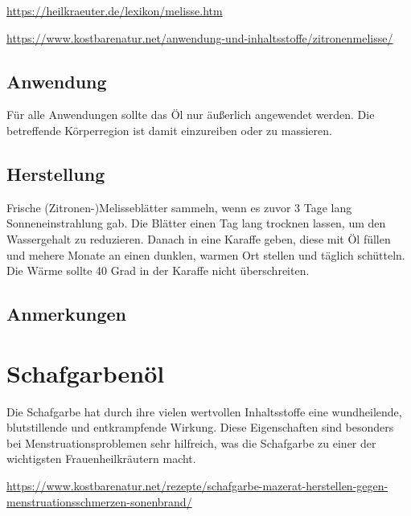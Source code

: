 \cite{heilkraeuterlexikon} 

\url{https://heilkraeuter.de/lexikon/melisse.htm} 

\url{https://www.kostbarenatur.net/anwendung-und-inhaltsstoffe/zitronenmelisse/}

 

\subsection{Anwendung}

Für alle Anwendungen sollte das Öl nur äußerlich angewendet werden. Die betreffende Körperregion ist damit einzureiben oder zu massieren.

\subsection{Herstellung}

Frische (Zitronen-)Melisseblätter sammeln, wenn es zuvor 3 Tage lang Sonneneinstrahlung gab. Die Blätter einen Tag lang trocknen lassen, um den Wassergehalt zu reduzieren. Danach in eine Karaffe geben, diese mit Öl füllen und mehere Monate an einen dunklen, warmen Ort stellen und täglich schütteln. Die Wärme sollte 40 Grad in der Karaffe nicht überschreiten.

\subsection{Anmerkungen}




\newpage



\section{Schafgarbenöl}

Die Schafgarbe hat durch ihre vielen wertvollen Inhaltsstoffe eine wundheilende, blutstillende und entkrampfende Wirkung. Diese Eigenschaften sind besonders bei Menstruationsproblemen sehr hilfreich, was die Schafgarbe zu einer der wichtigsten Frauenheilkräutern macht.

\url{https://www.kostbarenatur.net/rezepte/schafgarbe-mazerat-herstellen-gegen-menstruationsschmerzen-sonenbrand/}

    


